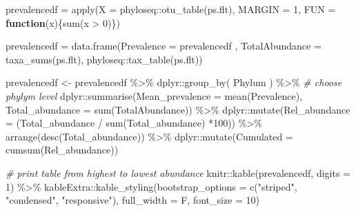 \documentclass[
]{book}
\newenvironment{Shaded}{\begin{snugshade}}{\end{snugshade}}
\newcommand{\AttributeTok}[1]{\textcolor[rgb]{0.77,0.63,0.00}{#1}}
\newcommand{\CommentTok}[1]{\textcolor[rgb]{0.56,0.35,0.01}{\textit{#1}}}
\newcommand{\ControlFlowTok}[1]{\textcolor[rgb]{0.13,0.29,0.53}{\textbf{#1}}}
\newcommand{\DecValTok}[1]{\textcolor[rgb]{0.00,0.00,0.81}{#1}}
\newcommand{\FunctionTok}[1]{\textcolor[rgb]{0.00,0.00,0.00}{#1}}
\newcommand{\NormalTok}[1]{#1}
\newcommand{\OtherTok}[1]{\textcolor[rgb]{0.56,0.35,0.01}{#1}}
\newcommand{\SpecialCharTok}[1]{\textcolor[rgb]{0.00,0.00,0.00}{#1}}
\newcommand{\StringTok}[1]{\textcolor[rgb]{0.31,0.60,0.02}{#1}}
\begin{document}
\begin{Shaded}
\begin{Highlighting}[]
\NormalTok{prevalencedf }\OtherTok{=} \FunctionTok{apply}\NormalTok{(}\AttributeTok{X =}\NormalTok{ phyloseq}\SpecialCharTok{::}\FunctionTok{otu\_table}\NormalTok{(ps.flt),}
                       \AttributeTok{MARGIN =} \DecValTok{1}\NormalTok{,}
                       \AttributeTok{FUN =} \ControlFlowTok{function}\NormalTok{(x)\{}\FunctionTok{sum}\NormalTok{(x }\SpecialCharTok{\textgreater{}} \DecValTok{0}\NormalTok{)\})}

\NormalTok{prevalencedf  }\OtherTok{=} \FunctionTok{data.frame}\NormalTok{(}\AttributeTok{Prevalence =}\NormalTok{ prevalencedf ,}
                            \AttributeTok{TotalAbundance =} \FunctionTok{taxa\_sums}\NormalTok{(ps.flt),}
\NormalTok{                            phyloseq}\SpecialCharTok{::}\FunctionTok{tax\_table}\NormalTok{(ps.flt))}

\NormalTok{prevalencedf }\OtherTok{\textless{}{-}}\NormalTok{ prevalencedf }\SpecialCharTok{\%\textgreater{}\%}
\NormalTok{    dplyr}\SpecialCharTok{::}\FunctionTok{group\_by}\NormalTok{( Phylum ) }\SpecialCharTok{\%\textgreater{}\%}   \CommentTok{\# choose phylym level}
\NormalTok{    dplyr}\SpecialCharTok{::}\FunctionTok{summarise}\NormalTok{(}\AttributeTok{Mean\_prevalence =} \FunctionTok{mean}\NormalTok{(Prevalence),}
                     \AttributeTok{Total\_abundance =} \FunctionTok{sum}\NormalTok{(TotalAbundance)) }\SpecialCharTok{\%\textgreater{}\%}
\NormalTok{    dplyr}\SpecialCharTok{::}\FunctionTok{mutate}\NormalTok{(}\AttributeTok{Rel\_abundance =}\NormalTok{ (Total\_abundance }\SpecialCharTok{/} \FunctionTok{sum}\NormalTok{(Total\_abundance) }\SpecialCharTok{*}\DecValTok{100}\NormalTok{)) }\SpecialCharTok{\%\textgreater{}\%}
    \FunctionTok{arrange}\NormalTok{(}\FunctionTok{desc}\NormalTok{(Total\_abundance)) }\SpecialCharTok{\%\textgreater{}\%}
\NormalTok{    dplyr}\SpecialCharTok{::}\FunctionTok{mutate}\NormalTok{(}\AttributeTok{Cumulated =} \FunctionTok{cumsum}\NormalTok{(Rel\_abundance))}

\CommentTok{\# print table from highest to lowest abundance }
\NormalTok{knitr}\SpecialCharTok{::}\FunctionTok{kable}\NormalTok{(prevalencedf, }\AttributeTok{digits =} \DecValTok{1}\NormalTok{) }\SpecialCharTok{\%\textgreater{}\%} 
\NormalTok{  kableExtra}\SpecialCharTok{::}\FunctionTok{kable\_styling}\NormalTok{(}\AttributeTok{bootstrap\_options =} \FunctionTok{c}\NormalTok{(}\StringTok{"striped"}\NormalTok{, }\StringTok{"condensed"}\NormalTok{, }\StringTok{"responsive"}\NormalTok{), }\AttributeTok{full\_width =}\NormalTok{ F, }\AttributeTok{font\_size =} \DecValTok{10}\NormalTok{)}
\end{Highlighting}
\end{Shaded}
\end{document}
